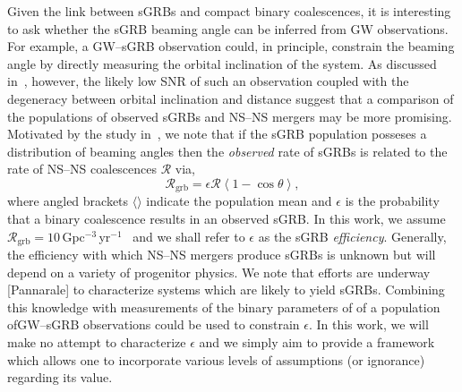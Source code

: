 \documentclass[twocolumn,nofootinbib]{revtex4-1}
\newcommand{\grbrate}{{{\mathcal R}_{\mathrm{grb}}}}
\newcommand{\cbcrate}{{{\mathcal R}}}
\newcommand{\BNS}{\ac{NS}--\ac{NS}\xspace}
\newcommand{\JOINT}{\ac{GW}--\ac{sGRB}\xspace}
\begin{document}
Given the link between \acp{sGRB} and compact binary coalescences, it is interesting to ask whether the \ac{sGRB} beaming angle can be inferred from \ac{GW} observations.
For example, a \JOINT observation could, in principle, constrain the beaming angle by directly measuring the orbital inclination of the system.
As discussed in~\cite{0004-637X-809-1-53}, however, the likely low \ac{SNR} of such an observation coupled with the degeneracy between orbital inclination and distance suggest that a comparison of the populations of observed \acp{sGRB} and \BNS mergers may be more promising.
Motivated by the study in~\cite{2013PhRvL.111r1101C}, we note that if the \ac{sGRB} population posseses a distribution of beaming angles then the \emph{observed} rate of \acp{sGRB} is related to the rate of \BNS coalescences $\cbcrate$ via,
%
\begin{equation}\label{eq:rate2angle}
    \grbrate = \epsilon\cbcrate \left \langle 1-\cos \theta \right \rangle,
\end{equation}
%
where angled brackets $\langle \rangle$ indicate the population mean and $\epsilon$ is the probability that a binary coalescence results in an observed \ac{sGRB}.
In this work, we assume $\grbrate=10$\,Gpc$^{-3}$\,yr$^{-1}$~\cite{nakar-2007,Dietz11} and we shall refer to $\epsilon$ as the \ac{sGRB} \emph{efficiency}.
Generally, the efficiency with which \BNS mergers produce \acp{sGRB} is unknown but will depend on a variety of progenitor physics.
We note that efforts are underway [Pannarale] to characterize systems which are likely to yield \acp{sGRB}.
Combining this knowledge with measurements of the binary parameters of of a population of\JOINT observations could be used to constrain $\epsilon$.
In this work, we will make no attempt to characterize $\epsilon$ and we simply aim to provide a framework which allows one to incorporate various levels of assumptions (or ignorance) regarding its value.
\end{document}
